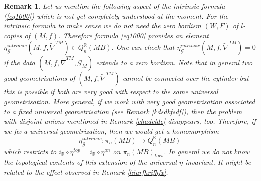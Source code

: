 \documentclass[12pt]{article}
\newtheorem{rem}[theorem]{Remark}
\newcommand{\cG}{{\mathcal{G}}}
\newcommand{\R}{{\mathbb{R}}}
\begin{document}
 
 \begin{rem}{\rm
Let us mention the following aspect of the intrinsic formula (\ref{eq1000}) which is not yet completely
understood at the moment. For the intrinsic formula to make sense we do not need the 
zero bordism $(W,F)$ of $l$-copies of $(M,f)$. Therefore formula \eqref{eq1000} provides an element
$\eta^{intrinsic}_{\cG}(M,f,\tilde \nabla^{TM})\in Q^{\R}_{n}(MB)$. 
One can check that $\eta^{intrinsic}_{\cG}(M,f,\tilde \nabla^{TM})=0$
if the data $(M,f,\tilde \nabla^{TM},\cG_{M})$ extends to a zero bordism.
Note that in general two good geometrisations of $(M,f,\tilde \nabla^{TM})$ cannot be connected over the cylinder but  this is possible if both are very good with respect to the same universal geometrisation. More general, if we work with very good geometrisation associated to a fixed universal geometrisation (see Remark \ref{kdsdkfsdf}), then the problem with disjoint unions
mentioned in Remark \ref{chadcldc} disappears, too.
Therefore, if we fix a universal geometrization, then  we would get a homomorphism
$$\eta_{\cG}^{intrinsic}:\pi_{n}(MB)\to Q^{\R}_{n}(MB)$$
which restricts to $i_{\R}\circ \eta^{top}=i_{\R}\circ \eta^{an}$ on
$ \pi_{n}(MB)_{tors}$. In general we do not know the topological contents of this extension of the universal $\eta$-invariant.
It might be related to the effect observed  in Remark \ref{hiurfhrifhfx}.
 }\end{rem}
 











 

 







 














 
 







 


 
 
 
\end{document}
